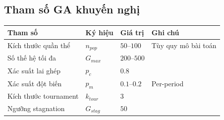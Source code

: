 \subsection{Tham số GA khuyến nghị}

\begin{center}
\begin{tabular}{llll}
\toprule
\textbf{Tham số} & \textbf{Ký hiệu} & \textbf{Giá trị} & \textbf{Ghi chú} \\
\midrule
Kích thước quần thể & $n_{pop}$ & $50$--$100$ & Tùy quy mô bài toán \\
Số thế hệ tối đa & $G_{max}$ & $200$--$500$ & \\
Xác suất lai ghép & $p_c$ & $0.8$ & \\
Xác suất đột biến & $p_m$ & $0.1$--$0.2$ & Per-period \\
Kích thước tournament & $k_{tour}$ & $3$ & \\
Ngưỡng stagnation & $G_{stag}$ & $50$ & \\
\bottomrule
\end{tabular}
\end{center}
